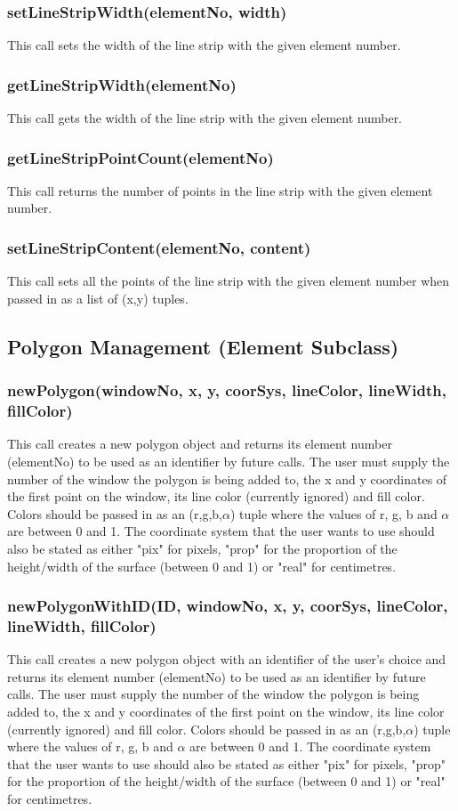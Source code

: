 \documentclass{acm_proc_article-sp}
\begin{document}
\subsubsection{setLineStripWidth(elementNo, width)}
This call sets the width of the line strip with the given element number.
\subsubsection{getLineStripWidth(elementNo)}
This call gets the width of the line strip with the given element number.
\subsubsection{getLineStripPointCount(elementNo)}
This call returns the number of points in the line strip with the given element number.
\subsubsection{setLineStripContent(elementNo, content)}
This call sets all the points of the line strip with the given element number when passed in as a list of (x,y) tuples.
\subsection{Polygon Management (Element Subclass)}
\subsubsection{newPolygon(windowNo, x, y, coorSys, lineColor, lineWidth, fillColor)}
This call creates a new polygon object and returns its element number (elementNo) to be used as an identifier by future calls. The user must supply the number of the window the polygon is being added to, the x and y coordinates of the first point on the window, its line color (currently ignored) and fill color. Colors should be passed in as an (r,g,b,$\alpha$) tuple where the values of r, g, b and $\alpha$ are between 0 and 1. The coordinate system that the user wants to use should also be stated as either "pix" for pixels, "prop" for the proportion of the height/width of the surface (between 0 and 1) or "real" for centimetres.
\subsubsection{newPolygonWithID(ID, windowNo, x, y, coorSys, lineColor, lineWidth, fillColor)}
This call creates a new polygon object with an identifier of the user's choice and returns its element number (elementNo) to be used as an identifier by future calls. The user must supply the number of the window the polygon is being added to, the x and y coordinates of the first point on the window, its line color (currently ignored) and fill color. Colors should be passed in as an (r,g,b,$\alpha$) tuple where the values of r, g, b and $\alpha$ are between 0 and 1. The coordinate system that the user wants to use should also be stated as either "pix" for pixels, "prop" for the proportion of the height/width of the surface (between 0 and 1) or "real" for centimetres.
\end{document}
